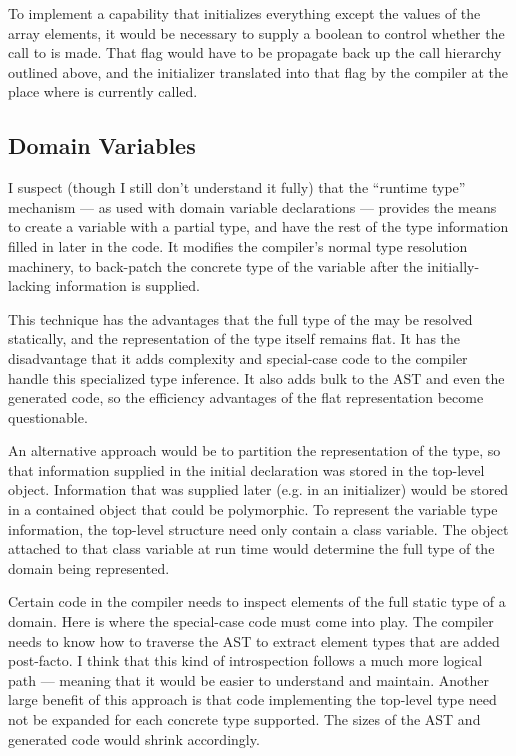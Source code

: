 To implement a  capability that initializes everything except the values of
the array elements, it would be necessary to supply a boolean to control whether the call
to  is made.  That flag would have to be propagate back up the call
hierarchy outlined above, and the  initializer translated into that flag by
the compiler at the place where  is currently
called.

\subsection{Domain Variables}

I suspect (though I still don't understand it fully) that the ``runtime type'' mechanism ---
as used with domain variable declarations --- provides the means to create a variable with
a partial type, and have the rest of the type information filled in later in the code.  It
modifies the compiler's normal type resolution machinery, to back-patch the concrete type
of the variable after the initially-lacking information is supplied.

This technique has the advantages that the full type of the may be resolved statically, and
the representation of the type itself remains flat.  It has the disadvantage that it adds
complexity and special-case code to the compiler handle this specialized type inference.
It also adds bulk to the AST and even the generated code, so the efficiency advantages of
the flat representation become questionable.

An alternative approach would be to partition the representation of the type, so that
information supplied in the initial declaration was stored in the top-level object.
Information that was supplied later (e.g. in an initializer) would be stored in a
contained object that could be polymorphic.  To represent the variable type information,
the top-level structure need only contain a class variable.  The object attached to that
class variable at run time would determine the full type of the domain being represented.

Certain code in the compiler needs to inspect elements of the full static type of a
domain.  Here is where the special-case code must come into play.  The compiler needs to
know how to traverse the AST to extract element types that are added post-facto.  I think
that this kind of introspection follows a much more logical path --- meaning that it would
be easier to understand and maintain.  Another large benefit of this approach is that code
implementing the top-level  type need not be expanded for each concrete type
supported.  The sizes of the AST and generated code would shrink accordingly.  

